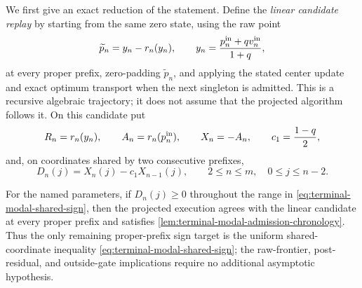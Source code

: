 We first give an exact reduction of the statement.  Define the
\emph{linear candidate replay} by starting from the same zero state, using
the raw point
\[
 \widetilde p_n=y_n-r_n(y_n),\qquad
 y_n=\frac{p_n^{\rm in}+qv_n^{\rm in}}{1+q},
\]
at every proper prefix, zero-padding $\widetilde p_n$, and applying the stated
center update and exact optimum transport when the next singleton is
admitted.  This is a recursive algebraic trajectory; it does not assume that
the projected algorithm follows it.  On this candidate put
\begin{equation}
 R_n=r_n(y_n),\qquad A_n=r_n(p_n^{\rm in}),\qquad X_n=-A_n,
 \qquad c_1=\frac{1-q}{2},
 \label{eq:terminal-modal-chronology-residuals}
\end{equation}
and, on coordinates shared by two consecutive prefixes,
\begin{equation}
 D_n(j)=X_n(j)-c_1X_{n-1}(j),\qquad
 2\le n\le m,\quad 0\le j\le n-2.
 \label{eq:terminal-modal-shared-sign}
\end{equation}

\begin{lemma}
\label{lem:terminal-modal-chronology-reduction}
For the named parameters, if
$D_n(j)\ge0$ throughout the range in
\eqref{eq:terminal-modal-shared-sign}, then the projected execution agrees
with the linear candidate at every proper prefix and satisfies
\cref{lem:terminal-modal-admission-chronology}.  Thus the only remaining
proper-prefix sign target is the uniform shared-coordinate inequality
\eqref{eq:terminal-modal-shared-sign}; the raw-frontier, post-residual, and
outside-gate implications require no additional asymptotic hypothesis.
\end{lemma}

